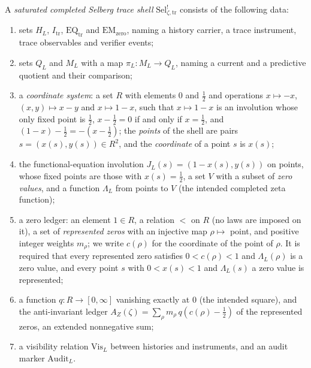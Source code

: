 \documentclass[11pt]{article}
\newcommand{\JL}{J_{L}}
\newcommand{\AZ}{A_{Z}(\zeta)}
\newcommand{\Sel}{\mathrm{Sel}^{!}_{\zeta,\mathrm{tr}}}
\newcommand{\Itr}{I_{\mathrm{tr}}}
\theoremstyle{definition}
\begin{document}
\begin{definition}
\label{def:rh:sat-sel-shell}
A \emph{saturated completed Selberg trace shell} \(\Sel\) consists of
the following data:
\begin{enumerate}[label=\textup{(\arabic*)}]
  \item sets \(H_L\), \(\Itr\), \(\mathrm{EQ}_{\mathrm{tr}}\) and
        \(\mathrm{EM}_{\mathrm{zero}}\), naming a history carrier, a
        trace instrument, trace observables and verifier events;
  \item sets \(Q_L\) and \(M_L\) with a map \(\pi_L:M_L\to Q_L\),
        naming a current and a predictive quotient and their
        comparison;
  \item a \emph{coordinate system}: a set \(R\) with elements \(0\) and
        \(\frac12\) and operations \(x\mapsto-x\), \((x,y)\mapsto x-y\) and
        \(x\mapsto1-x\), such that \(x\mapsto1-x\) is an involution whose
        only fixed point is \(\frac12\), \(x-\frac12=0\) if and only if
        \(x=\frac12\), and \((1-x)-\frac12=-(x-\frac12)\); the
        \emph{points} of the shell are pairs \(s=(x(s),y(s))\in R^2\), and the \emph{coordinate} of a point \(s\) is \(x(s)\);
  \item the functional-equation involution
        \(\JL(s)=(1-x(s),y(s))\) on points,
        whose fixed points are those with \(x(s)=\frac12\),
        a set \(V\) with a subset of \emph{zero values}, and a function
        \(\Lambda_L\) from points to \(V\) (the intended completed zeta
        function);
  \item a zero ledger: an element \(1\in R\), a relation \(<\) on \(R\)
        (no laws are imposed on it), a set of \emph{represented zeros}
        with an injective map \(\rho\mapsto\) point, and positive integer
        weights \(m_\rho\); we write \(c(\rho)\) for the coordinate of the
        point of \(\rho\).  It is required that every represented zero satisfies
        \(0<c(\rho)<1\) and \(\Lambda_L(\rho)\) is a zero
        value, and every point \(s\) with \(0<x(s)<1\) and
        \(\Lambda_L(s)\) a zero value is represented;
  \item a function \(q:R\to[0,\infty]\) vanishing exactly at \(0\) (the
        intended square), and the anti-invariant ledger
        \(\AZ=\sum_\rho m_\rho\,q(c(\rho)-\frac12)\) of the
        represented zeros, an extended nonnegative sum;
  \item a visibility relation \(\mathrm{Vis}_L\) between histories and
        instruments, and an audit marker \(\mathrm{Audit}_L\).
\end{enumerate}
\end{definition}
\end{document}
